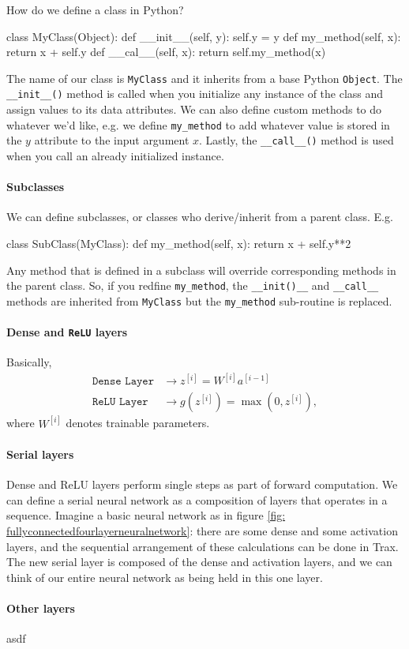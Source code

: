 \documentclass[12pt]{article}
\begin{document}
How do we define a class in Python?
\begin{python}
class MyClass(Object):
  def __init__(self, y):
    self.y = y
  def my_method(self, x):
    return x + self.y
  def __cal__(self, x):
    return self.my_method(x)  
\end{python}
The name of our class is \texttt{MyClass} and it inherits from a base Python \texttt{Object}. The \texttt{\_\_init\_\_()} method is called when you initialize any instance of the class and assign values to its data attributes. We can also define custom methods to do whatever we'd like, e.g. we define \texttt{my\_method} to add whatever value is stored in the $y$ attribute to the input argument $x$. Lastly, the \texttt{\_\_call\_\_()} method is used when you call an already initialized instance.

\paragraph{Subclasses} We can define subclasses, or classes who derive/inherit from a parent class. E.g.
\begin{python}
class SubClass(MyClass):
  def my_method(self, x):
    return x + self.y**2
\end{python}
Any method that is defined in a subclass will override corresponding methods in the parent class. So, if you redfine \texttt{my\_method}, the \texttt{\_\_init()\_\_} and \texttt{\_\_call\_\_} methods are inherited from \texttt{MyClass} but the \texttt{my\_method} sub-routine is replaced.

\paragraph{Dense and \texttt{ReLU} layers}
Basically,
\begin{align*}
  \texttt{Dense Layer} &\longrightarrow z^{[i]} = W^{[i]} a^{[i-1]} \\
  \texttt{ReLU Layer} &\longrightarrow g(z^{[i]}) = \max(0, z^{[i]}),
\end{align*}
where $W^{[i]}$ denotes trainable parameters.

\paragraph{Serial layers} Dense and ReLU layers perform single steps as part of forward computation. We can define a serial neural network as a composition of layers that operates in a sequence. Imagine a basic neural network as in figure \ref{fig: fullyconnectedfourlayerneuralnetwork}: there are some dense and some activation layers, and the sequential arrangement of these calculations can be done in Trax. The new serial layer is composed of the dense and activation layers, and we can think of our entire neural network as being held in this one layer.

\paragraph{Other layers}
asdf
\end{document}

